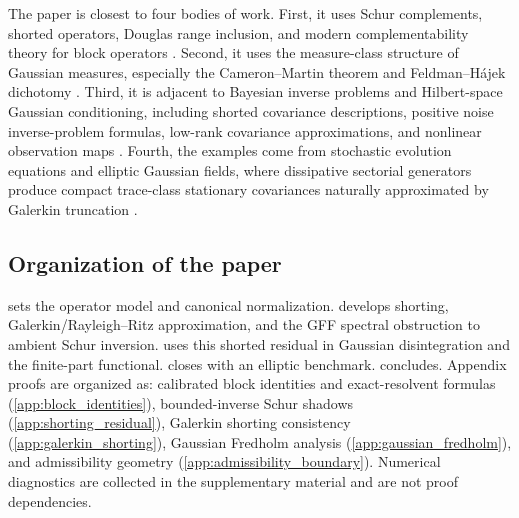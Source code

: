 \documentclass[preprint,12pt]{elsarticle}
\theoremstyle{plain}
\theoremstyle{definition}
\theoremstyle{remark}
\begin{document}
    The paper is closest to four bodies of work.  First, it uses Schur
    complements, shorted operators, Douglas range inclusion, and modern
    complementability theory for block operators
    \cite{krein1947selfadjoint,anderson1975shorted,douglas1966majorization,tretter2008spectral,contino2018schur,friedrich2017generalized,contino2021matrix,naikjohnson2024complementable,hassi2023complementation}.
    Second, it uses the measure-class structure of Gaussian measures,
    especially the Cameron--Martin theorem and Feldman--H\'{a}jek dichotomy
    \cite{cameron1944transformations,feldman1958equivalence,hajek1958property,bogachev1998gaussian}.
    Third, it is adjacent to Bayesian inverse problems and Hilbert-space
    Gaussian conditioning, including shorted covariance descriptions, positive
    noise inverse-problem formulas, low-rank covariance approximations, and nonlinear
    observation maps
    \cite{owhadi2015conditioning,stuart2010inverse,steinwart2024conditioning,chen2024gaussian,carerelie2024covariance,carerelie2025mean,quang2022kl}.
    Fourth, the examples come from stochastic evolution equations and elliptic
    Gaussian fields, where dissipative sectorial generators produce compact
    trace-class stationary covariances naturally approximated by Galerkin
    truncation \cite{daprato2014stochastic,lord2014introduction,simon2005trace,henderson2022sobolev,jorgensentian2024hilbert}.

    \subsection{Organization of the paper}
    \label{sec:organization}

     sets the operator model and canonical normalization.
     develops shorting, Galerkin/Rayleigh--Ritz approximation,
    and the GFF spectral obstruction to ambient Schur inversion.
     uses this shorted residual in Gaussian
    disintegration and the finite-part functional.  closes with an
    elliptic benchmark.  concludes. Appendix proofs are
    organized as: calibrated block identities and exact-resolvent formulas
    (\ref{app:block_identities}), bounded-inverse Schur shadows
    (\ref{app:shorting_residual}), Galerkin shorting consistency
    (\ref{app:galerkin_shorting}), Gaussian Fredholm analysis
    (\ref{app:gaussian_fredholm}), and admissibility geometry
    (\ref{app:admissibility_boundary}). Numerical diagnostics are collected
    in the supplementary material and are not proof dependencies.
\end{document}
